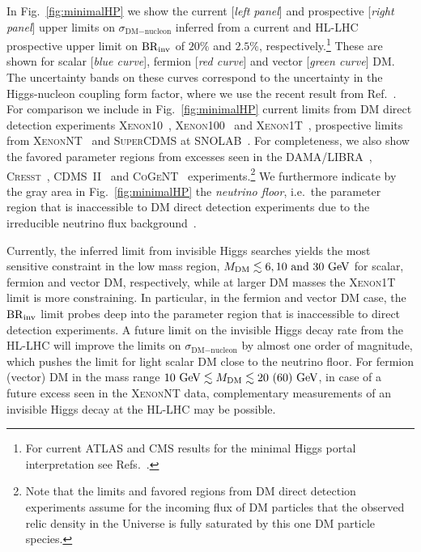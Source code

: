 \documentclass[../report.tex]{subfiles}
\begin{document}
In Fig.~\ref{fig:minimalHP} we show the current [\emph{left panel}] and prospective [\emph{right panel}] upper limits on $\sigma_{\text{DM}-\text{nucleon}}$ inferred from a current and HL-LHC prospective upper limit on $\mathrm{BR}_\mathrm{inv}$ of $20\%$ and $2.5\%$, respectively.\footnote{For current  ATLAS and CMS results for the minimal Higgs portal interpretation see Refs.~\cite{Aad:2015pla,Khachatryan:2016whc,Aaboud:2018sfi,Sirunyan:2018owy,ATLAS-CONF-2018-054}.} These are shown for scalar [\emph{blue curve}], fermion [\emph{red curve}]  and vector [\emph{green curve}] DM. The uncertainty bands on these curves correspond to the uncertainty in the Higgs-nucleon coupling form factor, where we use the recent result from Ref.~\cite{Hoferichter:2017olk}. For comparison we include in Fig.~\ref{fig:minimalHP} current limits from DM direct detection experiments \textsc{Xenon10}~\cite{Angle:2011th}, \textsc{Xenon100}~\cite{Aprile:2012nq} and \textsc{Xenon1T}~\cite{Aprile:2018dbl}, prospective limits from \textsc{XenonNT}~\cite{Aprile:2015uzo} and \textsc{SuperCDMS} at SNOLAB~\cite{Agnese:2016cpb}. For completeness, we also show the favored parameter regions from excesses seen in the \textsc{DAMA/LIBRA}~\cite{Savage:2008er}, \textsc{Cresst}~\cite{Angloher:2011uu}, \textsc{CDMS~II}~\cite{Agnese:2013rvf} and \textsc{CoGeNT}~\cite{Aalseth:2012if} experiments.\footnote{Note that the limits and favored regions from DM direct detection experiments assume for the incoming flux of DM particles that the observed relic density in the Universe is fully saturated by this one DM particle species.} We furthermore indicate by the gray area in Fig.~\ref{fig:minimalHP} the \emph{neutrino floor}, i.e.~the parameter region that is inaccessible to DM direct detection experiments due to the irreducible neutrino flux background~\cite{Billard:2013qya}.

Currently, the inferred limit from invisible Higgs searches yields the most sensitive constraint in the low mass region, $M_\text{DM} \lesssim 6, 10~\mbox{and}~30~\text{GeV}$ for scalar, fermion and vector DM, respectively, while at larger DM masses the \textsc{Xenon1T} limit is more constraining. In particular, in the fermion and vector DM case, the $\mathrm{BR}_\mathrm{inv}$ limit probes deep into the parameter region that is inaccessible to direct detection experiments. A future limit on the invisible Higgs decay rate from the HL-LHC will improve the limits on $\sigma_{\text{DM}-\text{nucleon}}$ by almost one order of magnitude, which pushes the limit for light scalar DM close to the neutrino floor. For fermion (vector) DM in the mass range $10~\text{GeV} \lesssim M_{\text{DM}} \lesssim 20~(60)~\text{GeV}$, in case of a future excess seen in the \textsc{XenonNT} data, complementary measurements of an invisible Higgs decay at the HL-LHC may be possible. 
\end{document}
